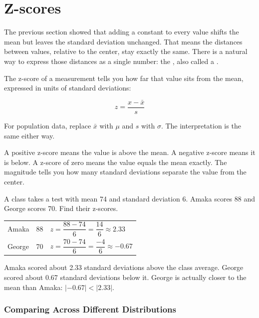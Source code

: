 \section{Z-scores}

The previous section showed that adding a constant to every value
shifts the mean but leaves the standard deviation unchanged. That
means the distances between values, relative to the center, stay
exactly the same. There is a natural way to express those distances
as a single number: the , also called
a .

The z-score of a measurement tells you how far that value sits from
the mean, expressed in units of standard deviations:

\[
z = \frac{x - \bar{x}}{s}
\]

For population data, replace $\bar{x}$ with $\mu$ and $s$ with
$\sigma$. The interpretation is the same either way.

A positive z-score means the value is above the mean. A negative
z-score means it is below. A z-score of zero means the value equals
the mean exactly. The magnitude tells you how many standard deviations
separate the value from the center.

\begin{Worked}
\begin{Problem}
A class takes a test with mean 74 and standard
deviation 6. Amaka scores 88 and George scores 70. Find their z-scores.
\end{Problem}
\begin{Solution}
\begin{center}
\begin{tabular}{lcl}
Amaka & 88 &
$z = \dfrac{88 - 74}{6} = \dfrac{14}{6} \approx 2.33$ \\[10pt]
George & 70 &
$z = \dfrac{70 - 74}{6} = \dfrac{-4}{6} \approx -0.67$ \\
\end{tabular}
\end{center}

Amaka scored about 2.33 standard deviations above the class
average. George scored about 0.67 standard deviations below it.
George is actually closer to the mean than Amaka: $|-0.67|
< |2.33|$.
\end{Solution}
\end{Worked}

\subsubsection*{Comparing Across Different Distributions}


